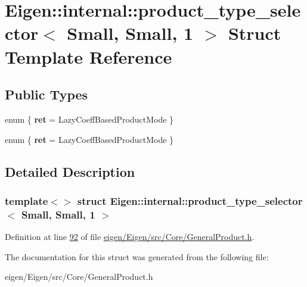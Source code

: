 \hypertarget{struct_eigen_1_1internal_1_1product__type__selector_3_01_small_00_01_small_00_011_01_4}{}\section{Eigen\+:\+:internal\+:\+:product\+\_\+type\+\_\+selector$<$ Small, Small, 1 $>$ Struct Template Reference}
\label{struct_eigen_1_1internal_1_1product__type__selector_3_01_small_00_01_small_00_011_01_4}
\subsection*{Public Types}
\begin{DoxyCompactItemize}
\item 
\mbox{\label{struct_eigen_1_1internal_1_1product__type__selector_3_01_small_00_01_small_00_011_01_4_a83659a4dfeaf144af4aae61d732504b5}} 
enum \{ {\bfseries ret} = Lazy\+Coeff\+Based\+Product\+Mode
 \}
\item 
\mbox{\label{struct_eigen_1_1internal_1_1product__type__selector_3_01_small_00_01_small_00_011_01_4_aec95fe37bf185ed413cbac8a3ae3bd3c}} 
enum \{ {\bfseries ret} = Lazy\+Coeff\+Based\+Product\+Mode
 \}
\end{DoxyCompactItemize}


\subsection{Detailed Description}
\subsubsection*{template$<$$>$\newline
struct Eigen\+::internal\+::product\+\_\+type\+\_\+selector$<$ Small, Small, 1 $>$}



Definition at line \hyperlink{eigen_2_eigen_2src_2_core_2_general_product_8h_source_l00092}{92} of file \hyperlink{eigen_2_eigen_2src_2_core_2_general_product_8h_source}{eigen/\+Eigen/src/\+Core/\+General\+Product.\+h}.



The documentation for this struct was generated from the following file\+:\begin{DoxyCompactItemize}
\item 
eigen/\+Eigen/src/\+Core/\+General\+Product.\+h\end{DoxyCompactItemize}
